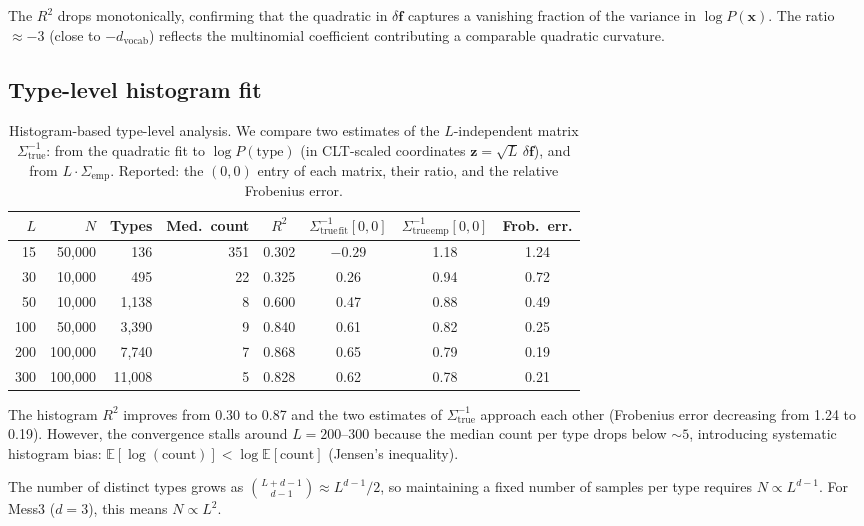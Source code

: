 \documentclass[11pt]{article}
\newcommand{\vf}{\mathbf{f}}
\newcommand{\vx}{\mathbf{x}}
\newcommand{\Strue}{\Sigma_{\mathrm{true}}}
\begin{document}
The $R^2$ drops monotonically, confirming that the quadratic in $\delta\vf$ captures a vanishing fraction of the variance in $\log P(\vx)$. The ratio $\approx -3$ (close to $-d_{\mathrm{vocab}}$) reflects the multinomial coefficient contributing a comparable quadratic curvature.

\subsection{Type-level histogram fit}

\begin{table}[h]
\centering
\caption{Histogram-based type-level analysis. We compare two estimates of the $L$-independent matrix $\Strue^{-1}$: from the quadratic fit to $\log P(\text{type})$ (in CLT-scaled coordinates $\mathbf{z} = \sqrt{L}\,\delta\vf$), and from $L \cdot \Sigma_{\mathrm{emp}}$. Reported: the $(0,0)$ entry of each matrix, their ratio, and the relative Frobenius error.}
\label{tab:type-level}
\begin{tabular}{rrrrcccc}
\toprule
$L$ & $N$ & Types & Med.\ count & $R^2$ & $\Strue^{-1}_{\mathrm{fit}}[0,0]$ & $\Strue^{-1}_{\mathrm{emp}}[0,0]$ & Frob.\ err. \\
\midrule
15  & 50{,}000  & 136    & 351 & 0.302 & $-0.29$ & 1.18 & 1.24 \\
30  & 10{,}000  & 495    & 22  & 0.325 & 0.26  & 0.94 & 0.72 \\
50  & 10{,}000  & 1{,}138  & 8   & 0.600 & 0.47  & 0.88 & 0.49 \\
100 & 50{,}000  & 3{,}390  & 9   & 0.840 & 0.61  & 0.82 & 0.25 \\
200 & 100{,}000 & 7{,}740  & 7   & 0.868 & 0.65  & 0.79 & 0.19 \\
300 & 100{,}000 & 11{,}008 & 5   & 0.828 & 0.62  & 0.78 & 0.21 \\
\bottomrule
\end{tabular}
\end{table}

The histogram $R^2$ improves from 0.30 to 0.87 and the two estimates of $\Strue^{-1}$ approach each other (Frobenius error decreasing from 1.24 to 0.19). However, the convergence stalls around $L = 200\text{--}300$ because the median count per type drops below $\sim 5$, introducing systematic histogram bias: $\mathbb{E}[\log(\text{count})] < \log \mathbb{E}[\text{count}]$ (Jensen's inequality).

The number of distinct types grows as $\binom{L + d - 1}{d - 1} \approx L^{d-1}/2$, so maintaining a fixed number of samples per type requires $N \propto L^{d-1}$. For Mess3 ($d = 3$), this means $N \propto L^2$.
\end{document}

